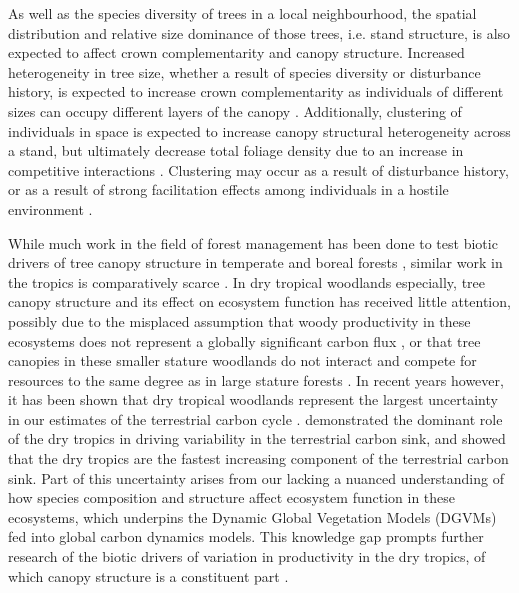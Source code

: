 \documentclass[11pt,a4paper]{article}
\begin{document}
As well as the species diversity of trees in a local neighbourhood, the spatial distribution and relative size dominance of those trees, i.e. stand structure, is also expected to affect crown complementarity and canopy structure. Increased heterogeneity in tree size, whether a result of species diversity or disturbance history, is expected to increase crown complementarity as individuals of different sizes can occupy different layers of the canopy \citep{}. Additionally, clustering of individuals in space is expected to increase canopy structural heterogeneity across a stand, but ultimately decrease total foliage density due to an increase in competitive interactions \citep{}. Clustering may occur as a result of disturbance history, or as a result of strong facilitation effects among individuals in a hostile environment \citep{}.

While much work in the field of forest management has been done to test biotic drivers of tree canopy structure in temperate \citep{} and boreal forests \citep{}, similar work in the tropics is comparatively scarce \citep{}. In dry tropical woodlands especially, tree canopy structure and its effect on ecosystem function has received little attention, possibly due to the misplaced assumption that woody productivity in these ecosystems does not represent a globally significant carbon flux \citep{}, or that tree canopies in these smaller stature woodlands do not interact and compete for resources to the same degree as in large stature forests \citep{}. In recent years however, it has been shown that dry tropical woodlands represent the largest uncertainty in our estimates of the terrestrial carbon cycle \citep{Quere2018, Ahlstrom2015}. \citet{Sitch2015} demonstrated the dominant role of the dry tropics in driving variability in the terrestrial carbon sink, and showed that the dry tropics are the fastest increasing component of the terrestrial carbon sink. Part of this uncertainty arises from our lacking a nuanced understanding of how species composition and structure affect ecosystem function in these ecosystems, which underpins the Dynamic Global Vegetation Models (DGVMs) fed into global carbon dynamics models. This knowledge gap prompts further research of the biotic drivers of variation in productivity in the dry tropics, of which canopy structure is a constituent part \citep{}.
\end{document}
